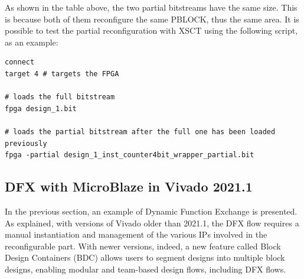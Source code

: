 As shown in the table above, the two partial bitstreams have the same size. This is because both of them reconfigure the same PBLOCK, thus the same area. It is possible to test the partial reconfiguration with XSCT using the following script, as an example:\bigskip

\begin{lstlisting}[style=tcl]
connect
target 4 # targets the FPGA

# loads the full bitstream
fpga design_1.bit 

# loads the partial bitstream after the full one has been loaded previously
fpga -partial design_1_inst_counter4bit_wrapper_partial.bit
\end{lstlisting}









\subsection{DFX with MicroBlaze in Vivado 2021.1}

In the previous section, an example of Dynamic Function Exchange is presented. As explained, with versions of Vivado older than 2021.1, the DFX flow requires a manual instantiation and management of the various IPs involved in the reconfigurable part. With newer versions, indeed, a new feature called Block Design Containers (BDC) allows users to segment designs into multiple block designs, enabling modular and team-based design flows, including DFX flows. \bigskip

